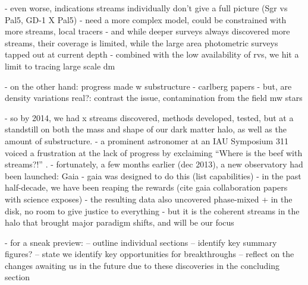 \documentclass[final,5p,times,twocolumn,authoryear]{elsarticle}
\begin{document}
- even worse, indications streams individually don't give a full picture (Sgr vs Pal5, GD-1 X Pal5)
- need a more complex model, could be constrained with more streams, local tracers
- and while deeper surveys always discovered more streams, their coverage is limited, while the large area photometric surveys tapped out at current depth
- combined with the low availability of rvs, we hit a limit to tracing large scale dm

- on the other hand: progress made w substructure
- carlberg papers
- but, are density variations real?: contrast the issue, contamination from the field mw stars

- so by 2014, we had x streams discovered, methods developed, tested, but at a standstill on both the mass and shape of our dark matter halo, as well as the amount of substructure.
- a prominent astronomer at an IAU Symposium 311 voiced a frustration at the lack of progress by exclaiming ``Where is the beef with streams?!'' \citep{binney:2014}.
- fortunately, a few months earlier (dec 2013), a new observatory had been launched: Gaia 
- gaia was designed to do this (list capabilities)
- in the past half-decade, we have been reaping the rewards (cite gaia collaboration papers with science exposes)
- the resulting data also uncovered phase-mixed + in the disk, no room to give justice to everything
- but it is the coherent streams in the halo that brought major paradigm shifts, and will be our focus

- for a sneak preview: 
-- outline individual sections
-- identify key summary figures?
-- state we identify key opportunities for breakthroughs
-- reflect on the changes awaiting us in the future due to these discoveries in the concluding section



\end{document}
